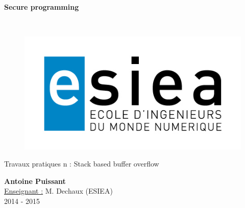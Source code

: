 \begin{titlepage}
      \begin{center}   
        \Huge
        \textbf{Secure programming}
        
        \LARGE
        ~
        
        
        \vfill
        \begin{figure}[H]
	    \centering
	    \begin{minipage}{0.9\textwidth}
		\centering
		\includegraphics[width=\textwidth]{./img/esiea.jpeg}
	    \end{minipage}\hfill
	\end{figure}
        \vfill
        
        \vspace{0.5cm}
        
        Travaux pratiques n : Stack based buffer overflow
        
        \vspace{2cm}
        \textbf{Antoine Puissant}\\
        \vspace{0.8cm}
        \Large
        \underline{Enseignant :} M. Dechaux (ESIEA)\\
        \vspace{0.5cm}
        2014 - 2015%
        
    \end{center}
\end{titlepage}
%  
%   
